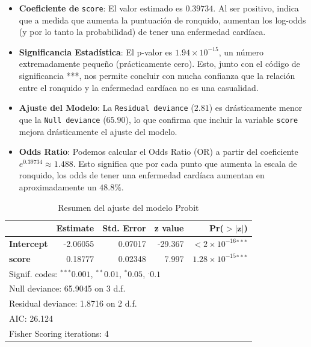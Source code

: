 \begin{itemize}
    \item \textbf{Coeficiente de} \texttt{score}: El valor estimado es $0.39734$. Al ser positivo, indica que a medida que aumenta la puntuación de ronquido, aumentan los log-odds (y por lo tanto la probabilidad) de tener una enfermedad cardíaca.
    
    \item \textbf{Significancia Estadística}: El p-valor es $1.94 \times 10^{-15}$, un número extremadamente pequeño (prácticamente cero). Esto, junto con el código de significancia ***, nos permite concluir con mucha confianza que la relación entre el ronquido y la enfermedad cardíaca no es una casualidad.
    
    \item \textbf{Ajuste del Modelo}: La \texttt{Residual deviance} ($2.81$) es drásticamente menor que la \texttt{Null deviance} ($65.90$), lo que confirma que incluir la variable \texttt{score} mejora drásticamente el ajuste del modelo.

    \item \textbf{Odds Ratio}: Podemos calcular el Odds Ratio (OR) a partir del coeficiente $e^{0.39734} \approx 1.488$. Esto significa que por cada punto que aumenta la escala de ronquido, los odds de tener una enfermedad cardíaca aumentan en aproximadamente un $48.8\%$.
\end{itemize}

\begin{table}[H]
\centering
\caption{Resumen del ajuste del modelo Probit}
\label{tab:probit_summary}
\begin{tabular}{lrrrr}
\hline
 & \textbf{Estimate} & \textbf{Std. Error} & \textbf{z value} & \textbf{Pr($\mathbf{>|z|}$)} \\
\hline
\textbf{Intercept} & -2.06055 & 0.07017 & -29.367 & $<2 \times 10^{-16}$$^{***}$ \\
\textbf{score}     & 0.18777  & 0.02348 & 7.997   & $1.28 \times 10^{-15}$$^{***}$ \\
\hline
\multicolumn{5}{l}{\footnotesize Signif. codes: $^{***}0.001$, $^{**}0.01$, $^{*}0.05$, $^{.}0.1$} \\
\multicolumn{5}{l}{\footnotesize Null deviance: 65.9045 on 3 d.f.} \\
\multicolumn{5}{l}{\footnotesize Residual deviance: 1.8716 on 2 d.f.} \\
\multicolumn{5}{l}{\footnotesize AIC: 26.124} \\
\multicolumn{5}{l}{\footnotesize Fisher Scoring iterations: 4} \\
\end{tabular}
\end{table}


